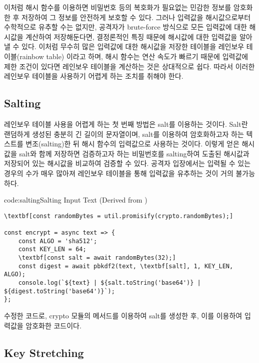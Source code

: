 이처럼 해시 함수를 이용하면 비밀번호 등의 복호화가 필요없는 민감한 정보를 암호화한 후 저장하여 그 정보를 안전하게 보호할 수 있다. 그러나 입력값을 해시값으로부터 수학적으로 유추할 수는 없지만, 공격자가 brute-force 방식으로 모든 입력값에 대한 해시값을 계산하여 저장해둔다면, 결정론적인 특징 때문에 해시값에 대한 입력값을 알아낼 수 있다. 이처럼 무수히 많은 입력값에 대한 해시값을 저장한 테이블을 레인보우 테이블(rainbow table) 이라고 하며, 해시 함수는 연산 속도가 빠르기 때문에 입력값에 제한 조건이 있다면 레인보우 테이블을 계산하는 것은 상대적으로 쉽다. 따라서 이러한 레인보우 테이블을 사용하기 어렵게 하는 조치를 취해야 한다.

\subsection*{Salting}

레인보우 테이블 사용을 어렵게 하는 첫 번째 방법은 salt를 이용하는 것이다. Salt란 랜덤하게 생성된 충분히 긴 길이의 문자열이며, salt를 이용하여 암호화하고자 하는 텍스트를 변조(salting)한 뒤 해시 함수의 입력값으로 사용하는 것이다. 이렇게 얻은 해시값을 salt와 함께 저장하면 검증하고자 하는 비밀번호를 salting하여 도출된 해시값과 저장되어 있는 해시값을 비교하여 검증할 수 있다. 공격자 입장에서는 입력될 수 있는 경우의 수가 매우 많아져 레인보우 테이블을 통해 입력값을 유추하는 것이 거의 불가능하다.

\begin{codeenv}{code:salting}{Salting Input Text (Derived from )}
\begin{Verbatim}[commandchars=\\\[\]]
\textbf[const randomBytes = util.promisify(crypto.randomBytes);]

const encrypt = async text => {
    const ALGO = 'sha512';
    const KEY_LEN = 64;
    \textbf[const salt = await randomBytes(32);]
    const digest = await pbkdf2(text, \textbf[salt], 1, KEY_LEN, ALGO);
    console.log(`${text} | ${salt.toString('base64')} | ${digest.toString('base64')}`);
};
\end{Verbatim}
\end{codeenv}

\은 \을 수정한 코드로, crypto 모듈의  메서드를 이용하여 salt를 생성한 후, 이를 이용하여 입력값을 암호화한 코드이다.

\subsection*{Key Stretching}

